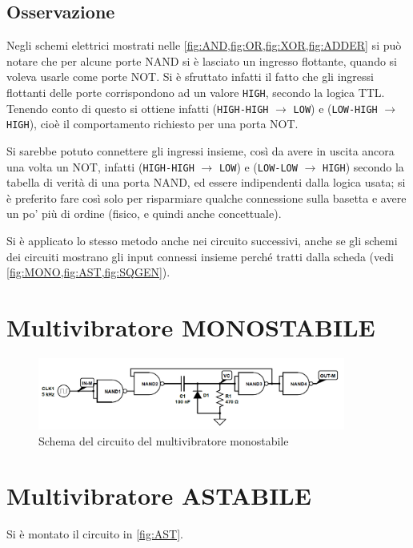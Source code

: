 \documentclass[a4paper,10pt]{article}
\def\code#1{\texttt{#1}}
\begin{document}
\subsection{Osservazione} Negli schemi elettrici mostrati nelle \cref{fig:AND,fig:OR,fig:XOR,fig:ADDER} si può notare che per alcune porte NAND si è lasciato un ingresso flottante, quando si voleva usarle come porte NOT. Si è sfruttato infatti il fatto che gli ingressi flottanti delle porte corrispondono ad un valore \code{HIGH}, secondo la logica TTL.
Tenendo conto di questo si ottiene infatti (\code{HIGH-HIGH} $\rightarrow$ \code{LOW}) e (\code{LOW-HIGH} $\rightarrow$ \code{HIGH}), cioè il comportamento richiesto per una porta NOT.

Si sarebbe potuto connettere gli ingressi insieme, così da avere in uscita ancora una volta un NOT, infatti (\code{HIGH-HIGH} $\rightarrow$ \code{LOW}) e (\code{LOW-LOW} $\rightarrow$ \code{HIGH}) secondo la tabella di verità di una porta NAND, ed essere indipendenti dalla logica usata; si è preferito fare così solo per risparmiare qualche connessione sulla basetta e avere un po' più di ordine (fisico, e quindi anche concettuale).

Si è applicato lo stesso metodo anche nei circuito successivi, anche se gli schemi dei circuiti mostrano gli input connessi insieme perché tratti dalla scheda (vedi \cref{fig:MONO,fig:AST,fig:SQGEN}).

\section{Multivibratore MONOSTABILE}

\begin{figure}[H]
	\centering
	\includegraphics[width=0.9\textwidth]{../grafici/Monostabile.png}
	\caption{Schema del circuito del multivibratore monostabile}
	\label{fig:MONO}
\end{figure}

\section{Multivibratore ASTABILE}

Si è montato il circuito in \cref{fig:AST}.
\end{document}
